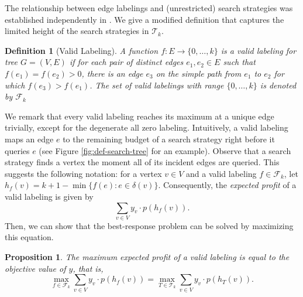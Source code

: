 \documentclass[11pt]{article}
\newtheorem{proposition}{Proposition}[section]
\newtheorem{definition}{Definition}[section]
\newcommand{\BSTs}{\mathcal{T}}
\newcommand\+{\mkern2mu}
\begin{document}
The relationship between edge labelings and (unrestricted) search strategies was established independently in \cite{dereniowski2008edge, onak2006generalization}. We give a modified definition that captures the limited height of the search strategies in $\BSTs_k$.
\begin{definition}[Valid Labeling] \label{def:validlabel} A function $f: E \to \{0, \ldots, k\}$ is a \emph{valid labeling} for tree $G=(V,E)$ if for each pair of distinct edges $e_1, e_2 \in E$ such that $f(e_1) = f(e_2) > 0$, there is an edge $e_3$ on the simple path from $e_1$ to $e_2$ for which $f(e_3) > f(e_1)$. The set of valid labelings with range $\{0, \ldots, k\}$ is denoted by $\mathcal{F}_k$
\end{definition}
We remark that every valid labeling reaches its maximum at a unique edge trivially, except for the degenerate all zero labeling. 
Intuitively, a valid labeling maps an edge $e$ to the remaining budget of a search strategy right before it queries $e$ (see Figure \ref{fig:def-search-tree} for an example). Observe that a search strategy finds a vertex the moment all of its incident edges are queried. This suggests the following notation: for a vertex $v \in V$ and a valid labeling $f \in \mathcal{F}_k$, let $h_f(v)=k + 1 - \min \{f(e) : e \in \delta(v)\}$. Consequently, the \emph{expected profit} of a valid labeling is given by
\begin{equation}\label{eq:labeling objective}
    \sum_{v \in V} y_v \cdot p\left(h_f(v)\right).
\end{equation}
Then, we can show that the best-response problem can be solved by maximizing this equation.
\begin{proposition}\label{prop:labeling=BST}
    The maximum expected profit of a valid labeling is equal to the objective value of $y$, that is,
    $$
    \max_{f\in \mathcal{F}_k} \sum_{v \in V} y_v \cdot p(h_f(v)) = \max_{T \in \BSTs_k} \sum_{v \in V} y_v \cdot p(h_T(v)).
    $$
\end{proposition}
\end{document}
